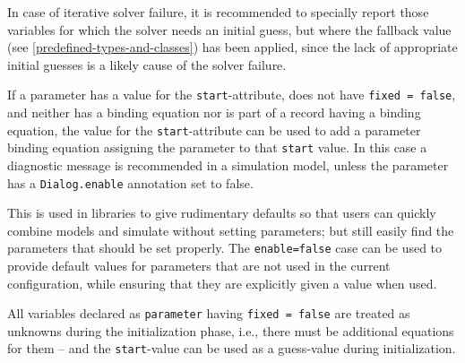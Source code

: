 \begin{nonnormative}
In case of iterative solver failure, it is recommended to specially report those variables for which the solver needs an initial guess, but where the fallback value (see \cref{predefined-types-and-classes}) has been applied, since the lack of appropriate initial guesses is a likely cause of the solver failure.
\end{nonnormative}

If a parameter has a value for the \lstinline!start!-attribute, does not have \lstinline!fixed = false!, and neither has a binding equation nor is part of a record having a binding equation, the value for the \lstinline!start!-attribute can be used to add a parameter binding equation assigning the parameter to that \lstinline!start! value.
In this case a diagnostic message is recommended in a simulation model, unless the parameter has a \lstinline!Dialog.enable! annotation set to false.

\begin{nonnormative}
This is used in libraries to give rudimentary defaults so that users can quickly combine models and simulate without setting parameters; but still easily find the parameters that should be set properly.
The \lstinline!enable=false! case can be used to provide default values for parameters that are not used in the current configuration, while ensuring that they are explicitly given a value when used.
\end{nonnormative}

All variables declared as \lstinline!parameter! having \lstinline!fixed = false! are treated as unknowns during the initialization phase, i.e., there must be additional equations for them -- and the \lstinline!start!-value can be used as a guess-value during initialization.

